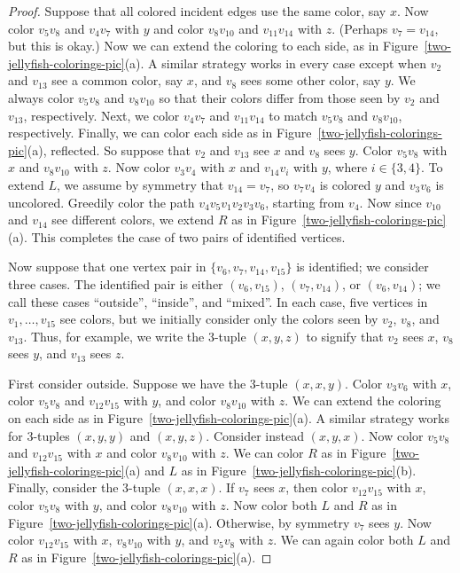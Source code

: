 \documentclass[12pt]{article}
\theoremstyle{plain}
\theoremstyle{definition}
\theoremstyle{remark}
\begin{document}
\begin{proof}
Suppose that all colored incident edges use the same color, say $x$.
Now color $v_5v_8$ and $v_4v_7$ with $y$ and color $v_8v_{10}$
and $v_{11}v_{14}$ with $z$.  (Perhaps $v_7=v_{14}$, but this is okay.)  Now we
can extend the coloring to each side,
as in Figure~\ref{two-jellyfish-colorings-pic}(a).  A similar strategy works in
every case except when $v_2$ and $v_{13}$ see a common color, say $x$, and $v_8$
sees some other color, say $y$.
We always color $v_5v_8$ and $v_8v_{10}$ so that
their colors differ from those seen by $v_2$ and $v_{13}$, respectively.
Next, we color $v_4v_7$ and $v_{11}v_{14}$ to match $v_5v_8$ and $v_8v_{10}$,
respectively.  Finally, we can color each side as in
Figure~\ref{two-jellyfish-colorings-pic}(a), reflected.  
%
%
So suppose that $v_2$ and $v_{13}$ see $x$ and $v_8$ sees $y$.  Color $v_5v_8$
with $x$ and $v_8v_{10}$ with $z$.  Now color $v_3v_4$ with $x$ and $v_{14}v_i$
with $y$, where $i\in\{3,4\}$.  To extend $L$, we assume by symmetry that
$v_{14}=v_7$, so $v_7v_4$ is colored $y$ and $v_3v_6$ is uncolored.  Greedily
color the path $v_4v_5v_1v_2v_3v_6$, starting from $v_4$.  Now since $v_{10}$
and $v_{14}$ see different colors, we extend $R$ as in
Figure~\ref{two-jellyfish-colorings-pic}(a).  
This completes the case of two pairs of identified vertices.
\bigskip

Now suppose that one vertex pair in $\{v_6,v_7,v_{14},v_{15}\}$ is
identified; we consider three cases.  The identified pair is either
$(v_6,v_{15})$, $(v_7,v_{14})$, or $(v_6,v_{14})$; we call these cases
``outside'', ``inside'', and ``mixed''.  In each case, five vertices in
$v_1,\ldots, v_{15}$ see colors, but we initially consider only the colors seen
by $v_2$, $v_8$, and $v_{13}$.  Thus, for example, we write the 3-tuple
$(x,y,z)$ to signify that $v_2$ sees $x$, $v_8$ sees $y$, and $v_{13}$ sees $z$.

First consider outside.  
Suppose we have the 3-tuple $(x,x,y)$.  Color $v_3v_6$ with $x$, color $v_5v_8$ and
$v_{12}v_{15}$ with $y$, and color $v_8v_{10}$ with $z$.
We can extend the
coloring on each side as in Figure~\ref{two-jellyfish-colorings-pic}(a).
A similar strategy works for 3-tuples $(x,y,y)$ and $(x,y,z)$.  Consider instead
$(x,y,x)$.  Now color $v_5v_8$ and $v_{12}v_{15}$ with $x$ and color
$v_8v_{10}$ with $z$.  We can color $R$ as in
Figure~\ref{two-jellyfish-colorings-pic}(a) and $L$ as in 
Figure~\ref{two-jellyfish-colorings-pic}(b).  Finally, consider the 3-tuple $(x,x,x)$.
If $v_7$ sees $x$, then color $v_{12}v_{15}$ with $x$,
color $v_5v_8$ with $y$, and color $v_8v_{10}$ with $z$.  Now
color both $L$ and $R$ as in Figure~\ref{two-jellyfish-colorings-pic}(a).  
Otherwise, by symmetry $v_7$ sees $y$.  
Now color $v_{12}v_{15}$ with $x$,  $v_8v_{10}$ with $y$, and $v_5v_8$ with $z$. 
We can again color both $L$ and $R$ as in Figure~\ref{two-jellyfish-colorings-pic}(a).  


\end{proof}
\end{document}

